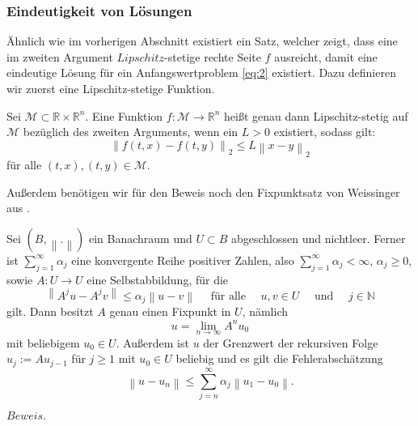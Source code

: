\subsubsection{Eindeutigkeit von Lösungen}
Ähnlich wie im vorherigen Abschnitt existiert ein Satz, welcher zeigt, dass eine im zweiten Argument $Lipschitz$-stetige
rechte Seite $f$ ausreicht, damit eine eindeutige Lösung für ein Anfangswertproblem \eqref{eq:2} existiert. Dazu
definieren wir zuerst eine Lipschitz-stetige Funktion.
\begin{definition}
    Sei $\mathcal{M} \subset \mathbb{R} \times \mathbb{R}^{n}$. Eine Funktion $f: \mathcal{M} \rightarrow \mathbb{R}^n$
    heißt genau dann Lipschitz-stetig auf $\mathcal{M}$ bezüglich des zweiten Arguments, wenn ein $L>0$ existiert,
    sodass gilt:
    \[
        \left\lVert f(t,x) - f(t,y) \right\rVert_2 \leq L \left\lVert x - y  \right\rVert_2
    \]
    für alle $(t,x), (t,y) \in \mathcal{M}$.
\end{definition}
Außerdem benötigen wir für den Beweis noch den Fixpunktsatz von Weissinger aus
\cite{harroheuserGewohnlicheDifferentialgleichungen}.
\begin{satz}
    \label{Fixpunktsatzvonweissinger}
    Sei $\left( B, \left\lVert . \right\rVert \right) $ ein Banachraum und $U \subset B$ abgeschlossen und nichtleer.
    Ferner ist $\sum_{j=1}^{\infty} \alpha_j$ eine konvergente Reihe positiver Zahlen, also
    $\sum_{j=1}^{\infty} \alpha_j < \infty $, $\alpha_j \geq 0$, sowie $A:U \rightarrow U$ eine Selbstabbildung, für die
    \[
        \left\lVert A^{j}u - A^{j}v \right\rVert \leq \alpha_j \left\lVert u - v \right\rVert \quad \text{ für alle }
        \quad u,v \in U \quad \text{ und } \quad j \in \mathbb{N}
    \]
    gilt. Dann besitzt $A$ genau einen Fixpunkt in $U$, nämlich
    \[
        u = \lim_{n\rightarrow \infty} A^{n}u_0
    \]
    mit beliebigem $u_0 \in U$. Außerdem ist $u$ der Grenzwert der rekursiven Folge $u_j:=Au_{j-1}$ für $j \geq 1$
    mit $u_0 \in U$ beliebig und es gilt die Fehlerabschätzung
    \[
        \left\lVert u - u_n \right\rVert \leq \sum_{j=n}^{\infty} \alpha_j \left\lVert u_1 - u_0 \right\rVert.
    \]
\end{satz}
$Beweis.$ \cite[139]{harroheuserGewohnlicheDifferentialgleichungen}\\
